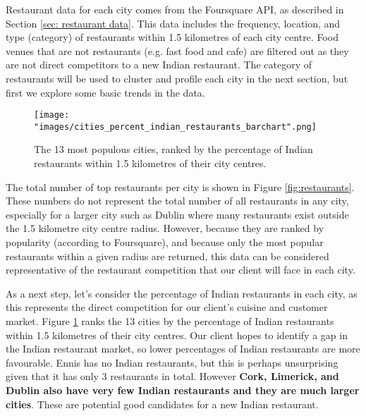 \documentclass[a4paper,11pt]{article}
\begin{document}
Restaurant data for each city comes from the Foursquare API, as described in Section \ref{sec: restaurant data}. This data includes the frequency, location, and type (category) of restaurants within 1.5 kilometres of each city centre. Food venues that are not restaurants (e.g. fast food and cafe) are filtered out as they are not direct competitors to a new Indian restaurant. The category of restaurants will be used to cluster and profile each city in the next section, but first we explore some basic trends in the data.
%
\begin{figure}[htb]
   \centering
   \texttt{[image: "images/cities\_percent\_indian\_restaurants\_barchart".png]}
      \caption{The 13 most populous cities, ranked by the percentage of Indian restaurants within 1.5 kilometres of their city centres.}
      \label{fig:city by indian restaurant}
\end{figure}
%
The total number of top restaurants per city is shown in Figure \ref{fig:restaurants}. These numbers do not represent the total number of all restaurants in any city, especially for a larger city such as Dublin where many restaurants exist outside the 1.5 kilometre city centre radius. However, because they are ranked by popularity (according to Foursquare), and because only the most popular restaurants within a given radius are returned, this data can be considered representative of the restaurant competition that our client will face in each city. 

As a next step, let's consider the percentage of Indian restaurants in each city, as this represents the direct competition for our client's cuisine and customer market. Figure \ref{fig:city by indian restaurant} ranks the 13 cities by the percentage of Indian restaurants within 1.5 kilometres of their city centres. Our client hopes to identify a gap in the Indian restaurant market, so lower percentages of Indian restaurants are more favourable. Ennis has no Indian restaurants, but this is perhaps unsurprising given that it has only 3 restaurants in total. However \textbf{Cork, Limerick, and Dublin also have very few Indian restaurants and they are much larger cities}. These are potential good candidates for a new Indian restaurant.
\end{document}
